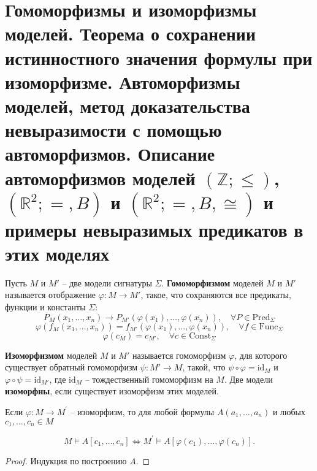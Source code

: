\section{\texorpdfstring{Гомоморфизмы и изоморфизмы моделей. Теорема о сохранении истинностного значения формулы
при изоморфизме. Автоморфизмы моделей, метод доказательства невыразимости с помощью автоморфизмов. Описание
автоморфизмов моделей $(\mathbb Z;\leqslant)$, $(\mathbb R^2;=,B)$ и $(\mathbb R^2;=,B,\cong)$ и примеры
невыразимых предикатов в этих моделях}{Гомоморфизмы и изоморфизмы моделей. Теорема о сохранении истинностного
значения формулы при изоморфизме. Автоморфизмы моделей, доказательство невыразимости через автоморфизмы. Описание
автоморфизмов некоторых моделей и примеры невыразимых предикатов в этих моделях}}
\begin{definition}
	Пусть $M$ и $M'$ -- две модели сигнатуры $\Sigma$. \textbf{Гомоморфизмом} моделей $M$ и $M'$ называется
	отображение $\varphi\colon M\to M'$, такое, что сохраняются все предикаты, функции и константы $\Sigma$:
	$$
		P_M(x_1,\ldots,x_n) \rightarrow P_{M'}(\varphi(x_1),\ldots,\varphi(x_n)),\quad\forall P\in
		\mathrm{Pred}_\Sigma
	$$
	$$
		\varphi(f_M(x_1,\ldots,x_n)) = f_{M'}(\varphi(x_1),\ldots,\varphi(x_n)),\quad\forall f\in\mathrm{Func}_\Sigma
	$$
	$$
		\varphi(c_M) = c_{M'},\quad\forall c\in\mathrm{Const}_\Sigma
	$$
\end{definition}
\begin{definition}
	\textbf{Изоморфизмом} моделей $M$ и $M'$ называется гомоморфизм $\varphi$, для которого существует обратный
	гомоморфизм $\psi\colon M'\to M$, такой, что $\psi\circ\varphi=\mathrm{id}_M$ и $\varphi\circ\psi =
	\mathrm{id}_{M'}$, где
	$\mathrm{id}_M$ -- тождественный гомоморфизм на $M$.
	Две модели \textbf{изоморфны}, если существует изоморфизм этих моделей.
\end{definition}

\begin{theorem}
Если $\varphi: M \rightarrow M^{\prime}$ -- изоморфизм, то для любой формулы $A\left(a_{1}, \ldots, a_{n}\right)$ и
	любых $c_{1}, \ldots, c_{n} \in M$

$$M \vDash A\left[c_{1}, \ldots, c_{n}\right] \Longleftrightarrow M^{\prime} \vDash
	A\left[\varphi\left(c_{1}\right), \ldots, \varphi\left(c_{n}\right)\right].$$
\end{theorem}

\begin{proof}
Индукция по построению $A$.
\end{proof}

